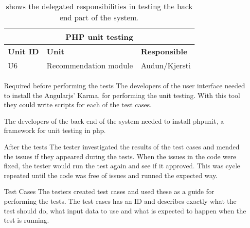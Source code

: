 \begin{table}[!h]
	\begin{center}
		\begin{tabular}{ | l | l | l |}
			\hline
			\multicolumn{3}{|c|}{\textbf{PHP unit testing}} \\
			\hline
			\textbf{Unit ID} & \textbf{Unit} & \textbf{Responsible} \\ \hline
			U6 & Recommendation module & Audun/Kjersti \\ \hline
		\end{tabular}
	\end{center}
	\caption{shows the delegated responsibilities in testing the back end part of the system.}
	\label{Tab_phptesting}
\end{table}

Required before performing the tests\newline
The developers of the user interface needed to install the Angularjs' Karma, for performing the unit testing. With this tool they could write scripts for each of the test cases.\newline

The developers of the back end of the system needed to install phpunit, a framework for unit testing in php.\newline

After the tests\newline
The tester investigated the results of the test cases and mended the issues if they appeared during the tests. When the issues in the code were fixed, the tester would run the test again and see if it approved. This was cycle repeated until the code was free of issues and runned the expected way.\newline

Test Cases\newline
The testers created test cases and used these as a guide for performing the tests. The test cases has an ID and describes exactly what the test should do, what input data to use and what is expected to happen when the test is running.   

